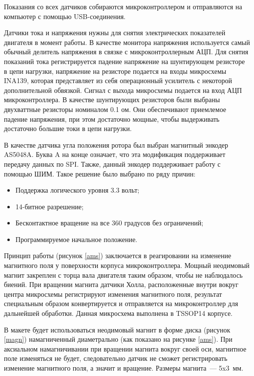 Показания со всех датчиков собираются микроконтроллером и отправляются на компьютер
с помощью USB-соединения.

Датчики тока и напряжения нужны для снятия электрических показателей двигателя в момент работы.
В качестве монитора напряжения используется самый обычный делитель напряжения в связке
с микроконтроллерным АЦП. Для снятия показаний тока регистрируется падение напряжение на 
шунтирующем резисторе в цепи нагрузки, напряжение на резисторе подается на входы микросхемы
INA139, которая представляет из себя операционный усилитель с некоторой дополнительной
обвязкой. Сигнал с выхода микросхемы подается на вход АЦП микроконтроллера.
В качестве шунтирующих резисторов были выбраны двухваттные резисторы номиналом 0.1 ом.
Они обеспечивают приемлемое падение напряжения, при этом достаточно мощные, чтобы выдерживать
достаточно большие токи в цепи нагрузки.

В качестве датчика угла положения ротора был выбран магнитный энкодер AS5048A. Буква A на
конце означает, что эта модификация поддерживает передачу данных по SPI. Также, данный
энкодер поддерживает работу с помощью ШИМ. Такое решение было выбрано по ряду причин:
\begin{itemize}
  \item Поддержка логического уровня 3.3 вольт;
  \item 14-битное разрешение;
  \item Бесконтактное вращение на все 360 градусов без ограничений;
  \item Программируемое начальное положение.
\end{itemize}
Принцип работы (рисунок \ref{ams}) заключается в реагировании на изменение магнитного поля у поверхности 
корпуса микроконтроллера. Мощный неодимовый магнит закреплен с торца вала двигателя
таким образом, чтобы не наблюдалось биений. При вращении магнита датчики Холла, 
расположенные внутри вокруг центра микросхемы регистрируют изменения магнитного поля,
результат специальным образом конвертируется и отправляется на микроконтроллер для
дальнейшей обработки. Данная микросхема выполнена в TSSOP14 корпусе. 


В макете будет использоваться неодимовый магнит в форме диска (рисунок \ref{magn}) намагниченный диаметрально
(как показано на рисунке \ref{ams}). При аксиальном намагничивании при вращении магнита вокруг своей оси,
магнитное поле изменяться не будет, следовательно датчик не сможет регистрировать изменение
магнитного поля, а значит и вращение. Размеры магнита~— 5x3~мм.

